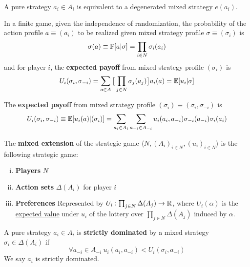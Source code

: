 \documentclass[11pt]{article}
\begin{document}
		\begin{remark}
			A pure strategy $a_i \in A_i$ is equivalent to a degenerated mixed strategy $e(a_i)$.
		\end{remark}
		
		\begin{proposition}
			In a finite game, given the independence of randomization, the probability of the action profile $a \equiv (a_i)$ to be realized given mixed strategy profile $\sigma \equiv (\sigma_i)$ is
			\begin{equation}
				\sigma (a) \equiv \mathbb{P}[{a|\sigma}] = \prod_{i \in N} \sigma_i(a_i)
			\end{equation}
			and for player $i$, the \textbf{expected payoff} from mixed strategy profile $(\sigma_i)$ is 
			\begin{equation}
				U_i(\sigma_{i}, \sigma_{-i}) = 
				\sum_{a \in A} \big[\prod_{j \in N} \sigma_j(a_j)\big] u_i(a) = \mathbb{E}[{u_i|\sigma}]
			\end{equation}
		\end{proposition}
		
		\begin{proposition}
			The \textbf{expected payoff} from mixed strategy profile $(\sigma_i) \equiv (\sigma_i, \sigma_{-i})$ is
			\begin{equation}
				U_i(\sigma_i, \sigma_{-i}) \equiv \mathbb{E}[{u_i(a)|(\sigma_i)}] = \sum_{a_i \in A_i} \sum_{a_{-i} \in A_{-i}} u_i(a_i, a_{-i}) \sigma_{-i}(a_{-i}) \sigma_i(a_i)
			\end{equation}
		\end{proposition}
		
		\begin{definition}
			The \textbf{mixed extension} of the strategic game $\langle N, (A_i)_{i\in N}, (u_i)_{i\in N} \rangle$ is the following strategic game:
			\begin{enumerate}[(i)]
				\item \textbf{Players} $N$
				\item \textbf{Action sets} $\Delta(A_i)$ for player $i$
				\item \textbf{Preferences} Represented by $U_i: \prod_{j \in N} \Delta(A_j) \to \mathbb{R}$, where $U_i(\alpha)$ is the \ul{expected value} under $u_i$ of the lottery over $\prod_{j \in N} \Delta(A_j)$ induced by $\alpha$.
			\end{enumerate}
		\end{definition}
		
		\begin{definition}
			A pure strategy $a_i \in A_i$ is \textbf{strictly dominated} by a mixed strategy $\sigma_i \in \Delta(A_i)$ if
			\begin{equation}
				\forall a_{-i} \in A_{-i}\ u_i(a_i, a_{-i}) < U_i(\sigma_i, a_{-i})
			\end{equation}
			We say $a_i$ is strictly dominated.
		\end{definition}
		
\end{document}
